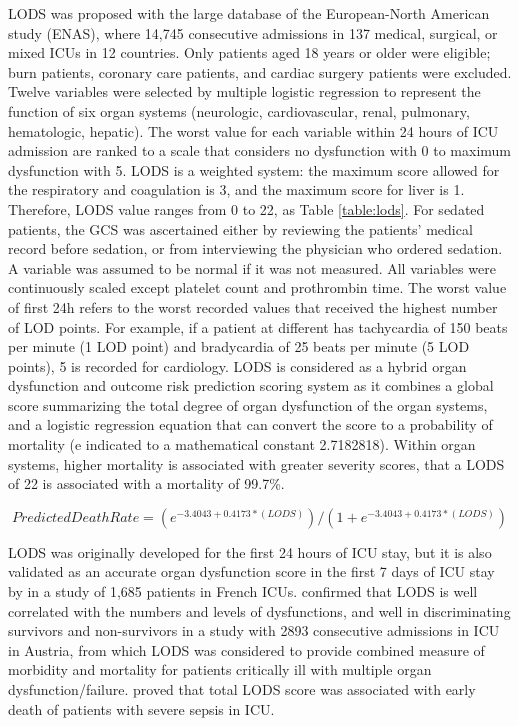 \documentclass[12pt,a4paper,english
]{tunithesis}
\begin{document}
LODS was proposed with the large database of the European-North American study (ENAS), where 14,745 consecutive admissions in 137 medical, surgical, or mixed ICUs in 12 countries. Only patients aged 18 years or older were eligible; burn patients, coronary care patients, and cardiac surgery patients were excluded. Twelve variables were selected by multiple logistic regression to represent the function of six organ systems (neurologic, cardiovascular, renal, pulmonary, hematologic, hepatic). The worst value for each variable within 24 hours of ICU admission are ranked to a scale that considers no dysfunction with 0 to maximum dysfunction with 5. LODS is a weighted system: the maximum score allowed for the respiratory and coagulation is 3, and the maximum score for liver is 1. Therefore, LODS value ranges from 0 to 22, as Table \ref{table:lods}. For sedated patients, the GCS was ascertained either by reviewing the patients' medical record before sedation, or from interviewing the physician who ordered sedation. A variable was assumed to be normal if it was not measured. All variables were continuously scaled except platelet count and prothrombin time. The worst value of first 24h refers to the worst recorded values that received the highest number of LOD points. For example, if a patient at different has tachycardia of 150 beats per minute (1 LOD point) and bradycardia of 25 beats per minute (5 LOD points), 5 is recorded for cardiology. LODS is considered as a hybrid organ dysfunction and outcome risk prediction scoring system as it combines a global score summarizing the total degree of organ dysfunction of the organ systems, and a logistic regression equation that can convert the score to a probability of mortality (e indicated to a mathematical constant 2.7182818). Within organ systems, higher mortality is associated with greater severity scores, that a LODS of 22 is associated with a mortality of 99.7\%. \parencite{Tiffany21, Vincent2010, sekulic2015}

\begin{equation*}
Predicted Death Rate = (e^{-3.4043 + 0.4173*(LODS)} ) / ( 1 +  e^{-3.4043 + 0.4173*(LODS)} )
\end{equation*}

LODS was originally developed for the first 24 hours of ICU stay, but it is also validated as an accurate organ dysfunction score in the first 7 days of ICU stay by \textcite{Timsit2002} in a study of 1,685 patients in French ICUs. \textcite{Metnitz2001} confirmed that LODS is well correlated with the numbers and levels of dysfunctions, and well in discriminating survivors and non-survivors in a study with 2893 consecutive admissions in ICU in Austria, from which LODS was considered to provide combined measure of morbidity and mortality for patients critically ill with multiple organ dysfunction/failure. \textcite{Blanco2008}  proved that total LODS score was associated with early death of patients with severe sepsis in ICU.
\end{document}
